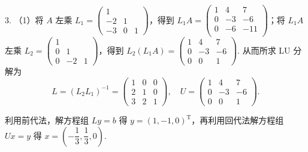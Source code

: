 \documentclass[UTF8]{ctexart}
\begin{document}
3. （1）将 $A$ 左乘 $L_1=\begin{pmatrix}
    1\\
    -2 & 1\\
    -3 & 0 & 1
\end{pmatrix}$，得到 $L_1A=\begin{pmatrix}
    1 & 4 & 7\\
    0 & -3 & -6\\
    0 & -6 & -11\\
\end{pmatrix}$；将 $L_1A$ 左乘 $L_2=\begin{pmatrix}
    1\\
    0&1\\
    0&-2&1
\end{pmatrix}$，得到 $L_2(L_1A)=\begin{pmatrix}
    1 & 4 & 7\\
    0 & -3 & -6\\
    0 & 0 & 1
\end{pmatrix}$. 从而所求 LU 分解为
\[L=(L_2L_1)^{-1}=\begin{pmatrix}
    1 & 0 & 0\\
    2 & 1 & 0\\
    3 & 2 & 1
\end{pmatrix},\quad U=\begin{pmatrix}
    1 & 4 & 7\\
    0 & -3 & -6\\
    0 & 0 & 1
\end{pmatrix}.\]

利用前代法，解方程组 $Ly=b$ 得 $y=(1,-1,0)^{\mathrm{T}}$，再利用回代法解方程组 $Ux=y$ 得 $x=\left(-\dfrac13,\dfrac13,0\right)$.
\end{document}
